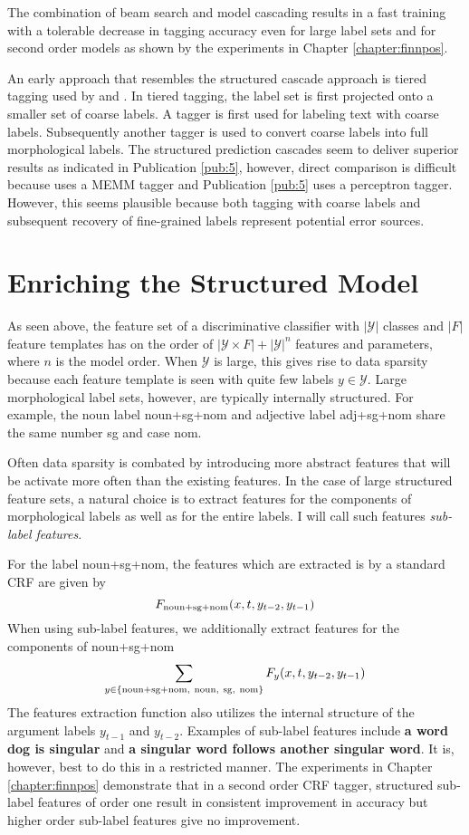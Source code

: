 The combination of beam search and model cascading results in a fast
training with a tolerable decrease in tagging accuracy even for large
label sets and for second order models as shown by the experiments in Chapter
\ref{chapter:finnpos}.

An early approach that resembles the structured cascade approach is
tiered tagging used by \cite{Tufis1999} and \cite{Ceausu2006}. In
tiered tagging, the label set is first projected onto a smaller set of
coarse labels. A tagger is first used for labeling text with coarse
labels. Subsequently another tagger is used to convert coarse labels
into full morphological labels. The structured prediction cascades
seem to deliver superior results as indicated in Publication
\ref{pub:5}, however, direct comparison is difficult because
\cite{Ceausu2006} uses a MEMM tagger and Publication \ref{pub:5} uses
a perceptron tagger. However, this seems plausible because both
tagging with coarse labels and subsequent recovery of fine-grained
labels represent potential error sources.
 
\section{Enriching the Structured Model}\label{sec:sub-labels}
As seen above, the feature set of a discriminative classifier with
$|\mathcal{Y}|$ classes and $|F|$ feature templates has on the order
of $|\mathcal{Y}\times F| + |\mathcal{Y}|^n$ features and parameters,
where $n$ is the model order. When $\mathcal{Y}$ is large, this gives
rise to data sparsity because each feature template is seen with quite
few labels $y \in \mathcal{Y}$. Large morphological label sets,
however, are typically internally structured. For example, the noun
label noun+sg+nom and adjective label adj+sg+nom share the
same number sg and case nom.

Often data sparsity is combated by introducing more abstract features
that will be activate more often than the existing features. In the
case of large structured feature sets, a natural choice is to extract
features for the components of morphological labels as well as for the
entire labels. I will call such features {\it sub-label features}.

For the label noun+sg+nom, the features which are extracted is by a standard CRF are given by
$$F_{\rm noun+sg+nom}(x, t, y_{t-2}, y_{t-1})$$
When using sub-label features, we additionally extract features for the components of noun+sg+nom
$$\sum_{y \in \{{\rm noun+sg+nom,\ noun,\ sg,\ nom\}}} F_{y}(x, t, y_{t-2}, y_{t-1})$$
The features extraction function also utilizes the internal structure
of the argument labels $y_{t-1}$ and $y_{t-2}$. Examples of sub-label
features include {\bf a word dog is singular} and {\bf a singular word
  follows another singular word}. It is, however, best to do this in a
restricted manner. The experiments in Chapter \ref{chapter:finnpos}
demonstrate that in a second order CRF tagger, structured sub-label
features of order one result in consistent improvement in accuracy but
higher order sub-label features give no improvement.

